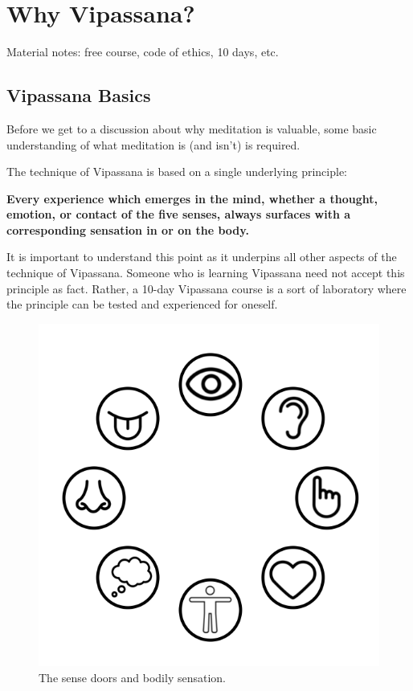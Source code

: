 \documentclass[a4paper, amsfonts, amssymb, amsmath, reprint, showkeys, nofootinbib, twoside]{revtex4-1}
\begin{document}
\section{Why Vipassana?}

Material notes: free course, code of ethics, 10 days, etc.

\subsection{Vipassana Basics}

Before we get to a discussion about why meditation is valuable, some basic
understanding of what meditation is (and isn't) is required.

The technique of Vipassana is based on a single underlying principle:

\vspace{1cm}
\textbf{Every experience which emerges in the mind, whether a thought, emotion, or
  contact of the five senses, always surfaces with a corresponding sensation in or on the body.}
\vspace{1cm}

\cite{hauke2018}

It is important to understand this point as it underpins all other aspects of the
technique of Vipassana. Someone who is learning Vipassana need not accept this
principle as fact. Rather, a 10-day Vipassana course is a sort of laboratory where the
principle can be tested and experienced for oneself.

\begin{figure}[H]
  \centering
  \includegraphics[width=0.8\linewidth]{images/sense-doors.png}
  \caption{The sense doors and bodily sensation. \cite{sense-icons}}
  \label{fig:sense-doors}
\end{figure}
\end{document}
